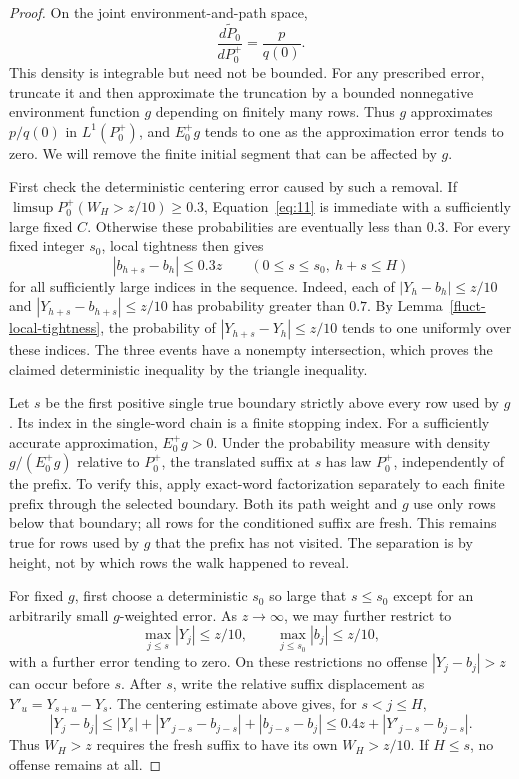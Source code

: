 \begin{proof}
On the joint environment-and-path space,
\[
\frac{d\widetilde P_0}{dP_0^+}=\frac{p}{q(0)}.
\]
This density is integrable but need not be bounded. For any prescribed
error, truncate it and then approximate the truncation by a bounded
nonnegative environment function \(g\) depending on finitely many
rows. Thus \(g\) approximates \(p/q(0)\) in \(L^1(P_0^+)\), and
\(E_0^+g\) tends to one as the approximation error tends to zero.
We will remove the finite initial segment that can be affected by \(g\).

First check the deterministic centering error caused by such a removal.
If \(\limsup P_0^+(W_H>z/10)\ge0.3\), Equation~\eqref{eq:11}
is immediate with a sufficiently large fixed \(C\). Otherwise these
probabilities are eventually less than \(0.3\). For every fixed
integer \(s_0\), local tightness then gives
\[
|b_{h+s}-b_h|\le0.3z
\qquad(0\le s\le s_0,\ h+s\le H)
\]
for all sufficiently large indices in the sequence. Indeed, each of
\(|Y_h-b_h|\le z/10\) and
\(|Y_{h+s}-b_{h+s}|\le z/10\) has probability greater than \(0.7\).
By Lemma~\ref{fluct-local-tightness}, the probability of
\(|Y_{h+s}-Y_h|\le z/10\) tends to one uniformly over these indices.
The three events have a nonempty intersection, which proves the
claimed deterministic inequality by the triangle inequality.

Let \(s\) be the first positive single true boundary strictly above
every row used by \(g\). Its index in the single-word chain is a finite
stopping index. For a sufficiently accurate approximation, \(E_0^+g>0\).
Under the probability measure with density \(g/(E_0^+g)\) relative to
\(P_0^+\), the translated suffix at \(s\) has law \(P_0^+\),
independently of the prefix. To verify this, apply exact-word
factorization separately to each finite prefix through the selected
boundary. Both its path weight and \(g\) use only rows below that
boundary; all rows for the conditioned suffix are fresh. This remains
true for rows used by \(g\) that the prefix has not visited. The
separation is by height, not by which rows the walk happened to reveal.

For fixed \(g\), first choose a deterministic \(s_0\) so large that
\(s\le s_0\) except for an arbitrarily small \(g\)-weighted error.
As \(z\to\infty\), we may further restrict to
\[
\max_{j\le s}|Y_j|\le z/10,
\qquad \max_{j\le s_0}|b_j|\le z/10,
\]
with a further error tending to zero. On these restrictions no offense
\(|Y_j-b_j|>z\) can occur before \(s\). After \(s\), write the
relative suffix displacement as \(Y'_u=Y_{s+u}-Y_s\). The centering
estimate above gives, for \(s<j\le H\),
\[
|Y_j-b_j|
\le |Y_s|+|Y'_{j-s}-b_{j-s}|+|b_{j-s}-b_j|
\le0.4z+|Y'_{j-s}-b_{j-s}|.
\]
Thus \(W_H>z\) requires the fresh suffix to have its own
\(W_H>z/10\). If \(H\le s\), no offense remains at all.


\end{proof}
